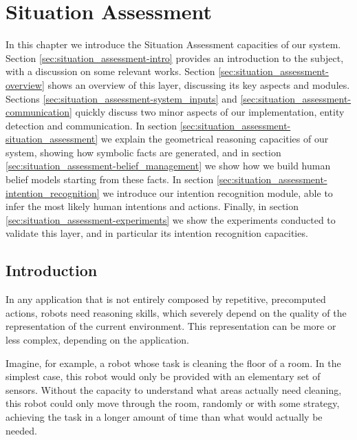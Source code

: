 
\chapter{Situation Assessment} %

\label{chapter:situation_assessment} %


In this chapter we introduce the Situation Assessment capacities of our system. Section \ref{sec:situation_assessment-intro} provides an introduction to the subject, with a discussion on some relevant works. Section \ref{sec:situation_assessment-overview} shows an overview of this layer, discussing its key aspects and modules. Sections \ref{sec:situation_assessment-system_inputs} and \ref{sec:situation_assessment-communication} quickly discuss two minor aspects of our implementation, entity detection and communication. In section \ref{sec:situation_assessment-situation_assessment} we explain the geometrical reasoning capacities of our system, showing how symbolic facts are generated, and in section \ref{sec:situation_assessment-belief_management} we show how we build human belief models starting from these facts. In section \ref{sec:situation_assessment-intention_recognition} we introduce our intention recognition module, able to infer the most likely human intentions and actions. Finally, in section \ref{sec:situation_assessment-experiments} we show the experiments conducted to validate this layer, and in particular its intention recognition capacities.

\section{Introduction}
In any application that is not entirely composed by repetitive, precomputed actions, robots need reasoning skills, which severely depend on the quality of the representation of the current environment. This representation can be more or less complex, depending on the application. 

Imagine, for example, a robot whose task is cleaning the floor of a room. In the simplest case, this robot would only be provided with an elementary set of sensors. Without the capacity to understand what areas actually need cleaning, this robot could only move through the room, randomly or with some strategy, achieving the task in a longer amount of time than what would actually be needed. 

